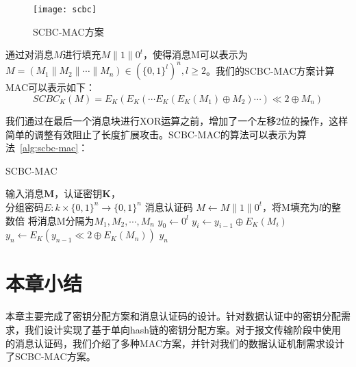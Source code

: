 \begin{figure}[htbp]
  \centering
  \texttt{[image: scbc]}
  \caption{SCBC-MAC方案}
  \label{fig:scbc}
\end{figure}

通过对消息$M$进行填充$M\| 1\|0^t$，使得消息M可以表示为$M=(M_1\|M_2\| \cdots \| M_n)\in (\{0,1\}^l)^n,l\geq 2$。我们的SCBC-MAC方案计算MAC可以表示如下：
\begin{equation}\label{scbc}
  SCBC_K(M)=E_K(E_K(\cdots E_K(E_K(M_1)\oplus M_2) \cdots)\ll 2 \oplus M_n)
\end{equation}

我们通过在最后一个消息块进行XOR运算之前，增加了一个左移2位的操作，这样简单的调整有效阻止了长度扩展攻击。SCBC-MAC的算法可以表示为算法~\ref{alg:scbc-mac}：

\begin{algorithm}[htbp]
  \caption{SCBC-MAC}
  \label{alg:scbc-mac}
  \begin{algorithmic}[1]
    \REQUIRE 输入消息$\mathbf{M}$，认证密钥$\mathbf{K}$，\\
            分组密码$E:k\times \{0,1\}^n \rightarrow \{0,1\}^n$
    \ENSURE 消息认证码
    \STATE $M \leftarrow M\| 1\|0^t$，将M填充为$l$的整数倍
        \STATE 将消息M分隔为$M_1,M_2,\cdots,M_n$
    \ENDIF
    \STATE $y_0\leftarrow 0^l$
        \STATE $y_i \leftarrow y_{i-1}\oplus E_K(M_i)$
    \ENDFOR
    \STATE $y_n \leftarrow E_K(y_{n-1}\ll 2 \oplus E_K(M_n))$
    \RETURN $y_n$
  \end{algorithmic}
\end{algorithm}


\section{本章小结}
本章主要完成了密钥分配方案和消息认证码的设计。针对数据认证中的密钥分配需求，我们设计实现了基于单向hash链的密钥分配方案。对于报文传输阶段中使用的消息认证码，我们介绍了多种MAC方案，并针对我们的数据认证机制需求设计了SCBC-MAC方案。
